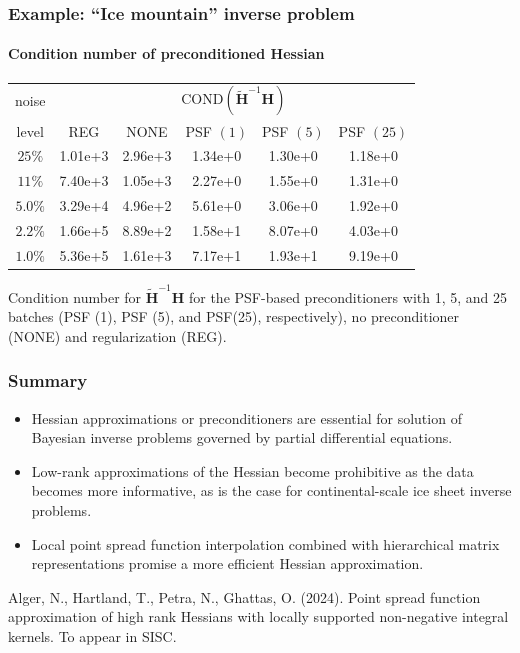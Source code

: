 \documentclass[10pt,final,xcolor=dvipsnames,aspect ratio=169]{beamer}
\newcommand{\preconditioner}{\widetilde{H}}
\begin{document}
\begin{frame}
	\frametitle{Example: ``Ice mountain'' inverse problem}
	\framesubtitle{Condition number of preconditioned Hessian}
	
	\begin{table}
		\begin{center}
			\begingroup
			\setlength{\tabcolsep}{4pt}
			\renewcommand{\arraystretch}{1.25}
			\begin{tabular}{c| c c c c c}
				noise    & \multicolumn{5}{c}{COND$(\mathbf{\preconditioner}^{-1} \mathbf{H})$ } \\ \cline{2-6}
				level    & REG     &	NONE  & PSF $(1)$ & PSF $(5)$ & PSF $(25)$ \\ \hline 
				$25\%$   & 1.01e+3 & 2.96e+3  & 1.34e+0   & 1.30e+0   & 1.18e+0    \\ 
				$11\%$   & 7.40e+3 & 1.05e+3  & 2.27e+0   & 1.55e+0   & 1.31e+0    \\   
				$5.0\%$  & 3.29e+4 & 4.96e+2  & 5.61e+0   & 3.06e+0   & 1.92e+0    \\ 
				$2.2\%$  & 1.66e+5 & 8.89e+2  & 1.58e+1   & 8.07e+0   & 4.03e+0    \\  
				$1.0\%$  & 5.36e+5 & 1.61e+3  & 7.17e+1   & 1.93e+1   & 9.19e+0    \\   
			\end{tabular}
			\endgroup
		\end{center}
	\end{table}
	
		Condition number for $\mathbf{\preconditioner}^{-1} \mathbf{H}$ for
		the PSF-based preconditioners with 1, 5, and 25 batches (PSF (1),
		PSF (5), and PSF(25), respectively), no preconditioner (NONE) and
		regularization (REG).
\end{frame}




\begin{frame}
	\frametitle{Summary}
	
	\begin{itemize}
		\setlength\itemsep{1.5em}
		\item Hessian approximations or preconditioners are essential for solution of Bayesian inverse problems governed by
		partial differential equations.
		\vspace{0.05in}
		\item Low-rank approximations of the Hessian become
		prohibitive as the data becomes more informative, as is the case
		for continental-scale ice sheet inverse problems.
		\vspace{0.05in}
		\item Local point spread function interpolation combined with hierarchical matrix representations promise a more efficient
		Hessian approximation.
	\end{itemize}
	\vspace{2em}
	{\small Alger, N., Hartland, T., Petra, N., Ghattas, O. (2024). Point spread function approximation of high rank Hessians with locally supported non-negative integral kernels. To appear in SISC.}
\end{frame}
\end{document}
